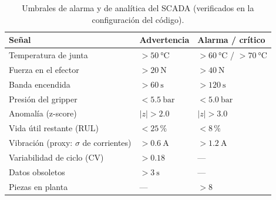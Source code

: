 \documentclass{styles/svproc}
\begin{document}
\begin{table}[t]
  \caption{Umbrales de alarma y de analítica del SCADA (verificados en la
  configuración del código).}
  \label{tab:umbrales}
  \centering
  \scriptsize
  \begin{tabular}{@{}lll@{}}
    \toprule
    Señal & Advertencia & Alarma / crítico \\
    \midrule
    Temperatura de junta & $>\SI{50}{\celsius}$ & $>\SI{60}{\celsius}$ / $>\SI{70}{\celsius}$ \\
    Fuerza en el efector & $>\SI{20}{\newton}$ & $>\SI{40}{\newton}$ \\
    Banda encendida & $>\SI{60}{\second}$ & $>\SI{120}{\second}$ \\
    Presión del gripper & $<\SI{5.5}{\bar}$ & $<\SI{5.0}{\bar}$ \\
    Anomalía (z-score) & $|z|>2.0$ & $|z|>3.0$ \\
    Vida útil restante (RUL) & $<25\,\%$ & $<8\,\%$ \\
    Vibración (proxy: $\sigma$ de corrientes) & $>\SI{0.6}{\ampere}$ & $>\SI{1.2}{\ampere}$ \\
    Variabilidad de ciclo (CV) & $>0.18$ & --- \\
    Datos obsoletos & $>\SI{3}{\second}$ & --- \\
    Piezas en planta & --- & $>8$ \\
    \bottomrule
  \end{tabular}
\end{table}
\end{document}
